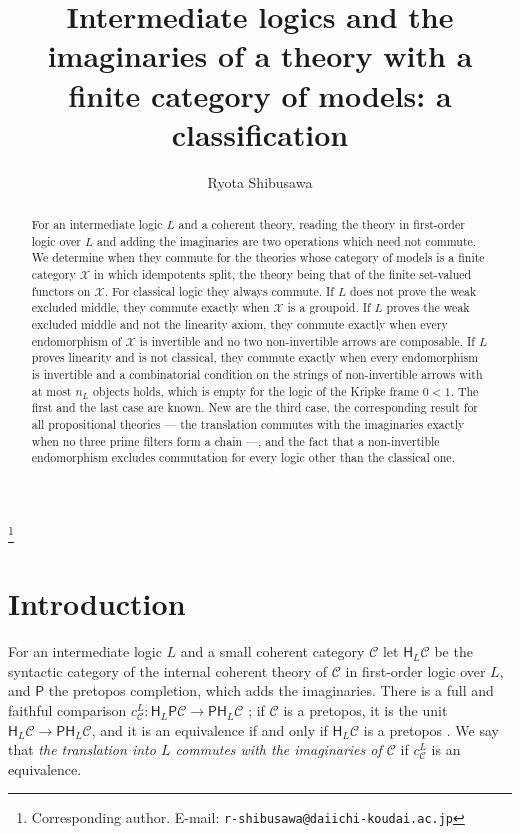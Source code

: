\documentclass[11pt]{amsart}
\theoremstyle{definition}
\newcommand{\PP}{\mathsf P}
\newcommand{\HH}{\mathsf H}
\newcommand{\cX}{\mathcal X}
\newcommand{\cC}{\mathcal C}
\begin{document}
\title[Intermediate logics and theories with a finite category of models]{Intermediate
logics and the imaginaries of a theory with a finite category of
models: a classification}
\author{Ryota Shibusawa}
\thanks{Corresponding author. E-mail: \texttt{r-shibusawa@daiichi-koudai.ac.jp}}
\address{Daiichi Institute of Technology}

\begin{abstract}
For an intermediate logic $L$ and a coherent theory, reading the
theory in first-order logic over $L$ and adding the imaginaries are two
operations which need not commute. We determine when they commute for
the theories whose category of models is a finite category $\cX$ in
which idempotents split, the theory being that of the finite
set-valued functors on $\cX$. For classical logic they always commute.
If $L$ does not prove the weak excluded middle, they commute exactly
when $\cX$ is a groupoid. If $L$ proves the weak excluded middle and
not the linearity axiom, they commute exactly when every endomorphism
of $\cX$ is invertible and no two non-invertible arrows are composable.
If $L$ proves linearity and is not classical, they commute exactly
when every endomorphism is invertible and a combinatorial condition on
the strings of non-invertible arrows with at most $n_L$ objects holds,
which is empty for the logic of the Kripke frame $0<1$. The first and the last
case are known. New are the third case, the corresponding result for
all propositional theories --- the translation commutes with the
imaginaries exactly when no three prime filters form a chain ---, and
the fact that a non-invertible
endomorphism excludes commutation for every logic other than the
classical one.
\end{abstract}

\maketitle

\section{Introduction}

For an intermediate logic $L$ and a small coherent category $\cC$ let
$\HH_L\cC$ be the syntactic category of the internal coherent theory of
$\cC$ in first-order logic over $L$, and $\PP$ the pretopos
completion, which adds the imaginaries. There is a full and faithful
comparison $c^L_\cC\colon\HH_L\PP\cC\to\PP\HH_L\cC$ \cite{Interm}; if
$\cC$ is a pretopos, it is the unit $\HH_L\cC\to\PP\HH_L\cC$, and it is
an equivalence if and only if $\HH_L\cC$ is a pretopos
\cite[Lemma~2.2]{Interm}. We say that \emph{the translation into $L$
commutes with the imaginaries of $\cC$} if $c^L_\cC$ is an equivalence.
\end{document}
